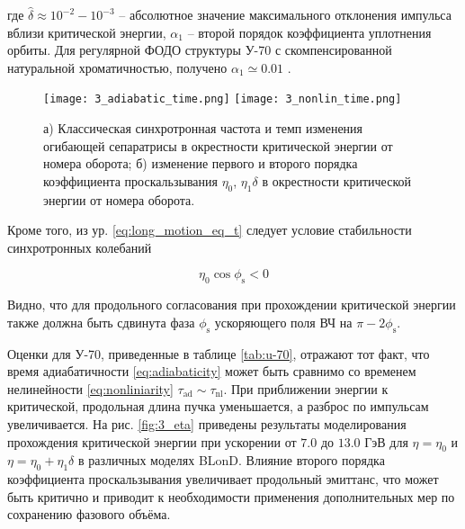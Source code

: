 \noindent где $\hat{\delta}\approx{10}^{-2}-{10}^{-3}$ – абсолютное значение максимального отклонения импульса вблизи критической энергии, $\alpha_1$ – второй порядок коэффициента уплотнения орбиты. Для регулярной ФОДО структуры У-70 с скомпенсированной натуральной хроматичностью, получено $\alpha_1\simeq0.01$ \cite{Kolokolchikov:2025_U70}.

\begin{figure}
   \texttt{[image: 3\_adiabatic\_time.png]}
   \texttt{[image: 3\_nonlin\_time.png]}
   \caption{а) Классическая синхротронная частота и темп изменения огибающей сепаратрисы в окрестности критической энергии от номера оборота; б) изменение первого и второго порядка коэффициента проскальзывания $\eta_0$, $\eta_1\delta$ в окрестности критической энергии от номера оборота.}
   \label{fig:adiabatic_time_nonlin_time}
\end{figure}

\par Кроме того, из ур. \ref{eq:long_motion_eq_t} следует условие стабильности синхротронных колебаний

\begin{equation}
\eta_0\cos\phi_{\textrm{s}}<0
\label{eq:long_stability}
\end{equation}

\noindent Видно, что для продольного согласования при прохождении критической энергии также должна быть сдвинута фаза $\phi_{\textrm{s}}$ ускоряющего поля ВЧ на $\pi-2\phi_{\textrm{s}}$.

\par Оценки для У-70, приведенные в таблице \ref{tab:u-70}, отражают тот факт, что время адиабатичности \ref{eq:adiabaticity} может быть сравнимо со временем нелинейности \ref{eq:nonliniarity} $\tau_{\textrm{ad}}\sim\tau_{\textrm{nl}}$. При приближении энергии к критической, продольная длина пучка уменьшается, а разброс по импульсам увеличивается. На рис. \ref{fig:3_eta} приведены результаты моделирования прохождения критической энергии при ускорении от $7.0$ до $13.0$ ГэВ для $\eta=\eta_0$ и $\eta=\eta_0+\eta_1\delta$ в различных моделях BLonD. Влияние второго порядка коэффициента проскальзывания увеличивает продольный эмиттанс, что может быть критично и приводит к необходимости применения дополнительных мер по сохранению фазового объёма.

